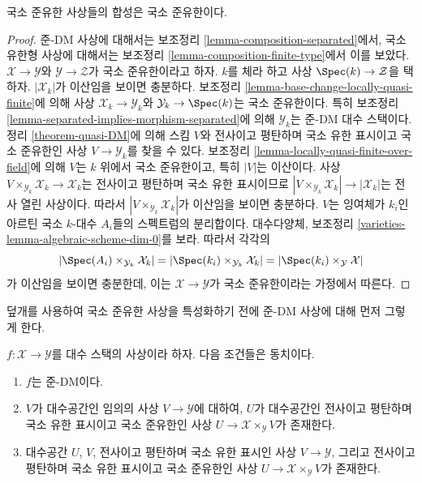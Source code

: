 \begin{lemma}
\label{lemma-composition-locally-quasi-finite}
국소 준유한 사상들의 합성은 국소 준유한이다.%
\end{lemma}

\begin{proof}
준-DM 사상에 대해서는 보조정리 \ref{lemma-composition-separated}에서,
국소 유한형 사상에 대해서는 보조정리
\ref{lemma-composition-finite-type}에서 이를 보았다.
$\mathcal{X} \to \mathcal{Y}$와 $\mathcal{Y} \to \mathcal{Z}$가 국소
준유한이라고 하자. $k$를 체라 하고 사상
$\Spec(k) \to \mathcal{Z}$을 택하자. $|\mathcal{X}_k|$가 이산임을
보이면 충분하다. 보조정리 \ref{lemma-base-change-locally-quasi-finite}에
의해 사상 $\mathcal{X}_k \to \mathcal{Y}_k$와
$\mathcal{Y}_k \to \Spec(k)$는 국소 준유한이다. 특히
보조정리 \ref{lemma-separated-implies-morphism-separated}에 의해
$\mathcal{Y}_k$는 준-DM 대수 스택이다. 정리 \ref{theorem-quasi-DM}에
의해 스킴 $V$와 전사이고 평탄하며 국소 유한 표시이고 국소 준유한인
사상 $V \to \mathcal{Y}_k$를 찾을 수 있다. 보조정리
\ref{lemma-locally-quasi-finite-over-field}에 의해 $V$는 $k$ 위에서 국소
준유한이고, 특히 $|V|$는 이산이다. 사상
$V \times_{\mathcal{Y}_k} \mathcal{X}_k \to \mathcal{X}_k$는 전사이고
평탄하며 국소 유한 표시이므로
$|V \times_{\mathcal{Y}_k} \mathcal{X}_k| \to |\mathcal{X}_k|$는 전사
열린 사상이다. 따라서 $|V \times_{\mathcal{Y}_k} \mathcal{X}_k|$가
이산임을 보이면 충분하다. $V$는 잉여체가 $k_i$인 아르틴 국소
$k$-대수 $A_i$들의 스펙트럼의 분리합이다. 대수다양체, 보조정리
\ref{varieties-lemma-algebraic-scheme-dim-0}를 보라. 따라서 각각의
$$
|\Spec(A_i) \times_{\mathcal{Y}_k} \mathcal{X}_k| =
|\Spec(k_i) \times_{\mathcal{Y}_k} \mathcal{X}_k| =
|\Spec(k_i) \times_\mathcal{Y} \mathcal{X}|
$$
가 이산임을 보이면 충분한데, 이는 $\mathcal{X} \to \mathcal{Y}$가
국소 준유한이라는 가정에서 따른다.
\end{proof}

\noindent
덮개를 사용하여 국소 준유한 사상을 특성화하기 전에 준-DM 사상에 대해
먼저 그렇게 한다.

\begin{lemma}
\label{lemma-characterize-quasi-DM}
$f : \mathcal{X} \to \mathcal{Y}$를 대수 스택의 사상이라 하자.
다음 조건들은 동치이다.
\begin{enumerate}
\item $f$는 준-DM이다.
\item $V$가 대수공간인 임의의 사상 $V \to \mathcal{Y}$에 대하여,
$U$가 대수공간인 전사이고 평탄하며 국소 유한 표시이고 국소 준유한인
사상 $U \to \mathcal{X} \times_\mathcal{Y} V$가 존재한다.
\item 대수공간 $U$, $V$, 전사이고 평탄하며 국소 유한 표시인 사상
$V \to \mathcal{Y}$, 그리고 전사이고 평탄하며 국소 유한 표시이고
국소 준유한인 사상 $U \to \mathcal{X} \times_\mathcal{Y} V$가 존재한다.
\end{enumerate}
\end{lemma}

